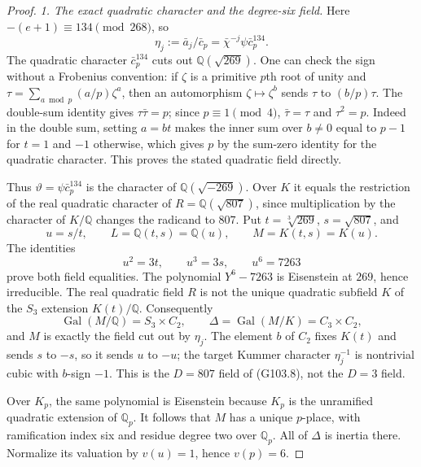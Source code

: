 \begin{proof}
\emph{1. The exact quadratic character and the degree-six field.}
Here $-(e+1)\equiv134\pmod{268}$, so
\[
       \eta_j:=\bar a_j/\bar c_p
          =\bar\chi^{-j}\psi\bar c_p^{134}.
 \tag{G115.3}
\]
The quadratic character $\bar c_p^{134}$ cuts out
$\mathbb Q(\sqrt{269})$.
One can check the sign without a Frobenius convention: if
$\zeta$ is a primitive $p$th root of unity and
$\tau=\sum_{a\bmod p}(a/p)\zeta^a$, then an automorphism
$\zeta\mapsto\zeta^b$ sends $\tau$ to $(b/p)\tau$.
The double-sum identity gives $\tau\bar\tau=p$;
since $p\equiv1\pmod4$, $\bar\tau=\tau$ and $\tau^2=p$.
Indeed in the double sum, setting $a=bt$ makes the inner sum
over $b\ne0$ equal to $p-1$ for $t=1$ and $-1$ otherwise,
which gives $p$ by the sum-zero identity for the quadratic
character.  This proves the stated quadratic field directly.

Thus $\vartheta=\psi\bar c_p^{134}$ is the character of
$\mathbb Q(\sqrt{-269})$.  Over $K$ it equals the restriction
of the real quadratic character of
$R=\mathbb Q(\sqrt{807})$, since multiplication by the
character of $K/\mathbb Q$ changes the radicand to $807$.
Put $t=\sqrt[3]{269}$, $s=\sqrt{807}$, and
\[
       u=s/t,\qquad L=\mathbb Q(t,s)=\mathbb Q(u),
       \qquad M=K(t,s)=K(u).
 \tag{G115.4}
\]
The identities
\[
             u^2=3t,\qquad u^3=3s,\qquad u^6=7263
 \tag{G115.5}
\]
prove both field equalities.  The polynomial
$Y^6-7263$ is Eisenstein at $269$, hence irreducible.
The real quadratic field $R$ is not the unique quadratic
subfield $K$ of the $S_3$ extension $K(t)/\mathbb Q$.
Consequently
\[
 \operatorname{Gal}(M/\mathbb Q)=S_3\times C_2,
 \qquad \Delta=\operatorname{Gal}(M/K)=C_3\times C_2,
 \tag{G115.6}
\]
and $M$ is exactly the field cut out by $\eta_j$.
The element $b$ of $C_2$ fixes $K(t)$ and sends $s$ to $-s$,
so it sends $u$ to $-u$; the target Kummer character
$\eta_j^{-1}$ is nontrivial cubic with $b$-sign $-1$.
This is the $D=807$ field of (G103.8), not the $D=3$ field.

Over $K_p$, the same polynomial is Eisenstein because $K_p$
is the unramified quadratic extension of $\mathbb Q_p$.
It follows that $M$ has a unique $p$-place, with ramification
index six and residue degree two over $\mathbb Q_p$.
All of $\Delta$ is inertia there.
Normalize its valuation by $v(u)=1$, hence $v(p)=6$.


\end{proof}
